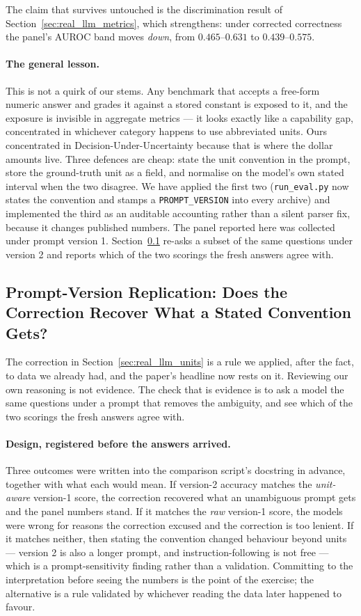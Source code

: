 \documentclass{article}
\begin{document}
The claim that survives untouched is the discrimination result of Section~\ref{sec:real_llm_metrics}, which strengthens: under corrected correctness the panel's AUROC band moves \emph{down}, from $0.465$--$0.631$ to $0.439$--$0.575$.

\paragraph{The general lesson.} This is not a quirk of our stems. Any benchmark that accepts a free-form numeric answer and grades it against a stored constant is exposed to it, and the exposure is invisible in aggregate metrics --- it looks exactly like a capability gap, concentrated in whichever category happens to use abbreviated units. Ours concentrated in Decision-Under-Uncertainty because that is where the dollar amounts live. Three defences are cheap: state the unit convention in the prompt, store the ground-truth unit as a field, and normalise on the model's own stated interval when the two disagree. We have applied the first two (\texttt{run\_eval.py} now states the convention and stamps a \texttt{PROMPT\_VERSION} into every archive) and implemented the third as an auditable accounting rather than a silent parser fix, because it changes published numbers. The panel reported here was collected under prompt version 1. Section~\ref{sec:real_llm_promptv2} re-asks a subset of the same questions under version 2 and reports which of the two scorings the fresh answers agree with.

\subsection{Prompt-Version Replication: Does the Correction Recover What a Stated Convention Gets?}
\label{sec:real_llm_promptv2}

The correction in Section~\ref{sec:real_llm_units} is a rule we applied, after the fact, to data we already had, and the paper's headline now rests on it. Reviewing our own reasoning is not evidence. The check that is evidence is to ask a model the same questions under a prompt that removes the ambiguity, and see which of the two scorings the fresh answers agree with.

\paragraph{Design, registered before the answers arrived.} Three outcomes were written into the comparison script's docstring in advance, together with what each would mean. If version-2 accuracy matches the \emph{unit-aware} version-1 score, the correction recovered what an unambiguous prompt gets and the panel numbers stand. If it matches the \emph{raw} version-1 score, the models were wrong for reasons the correction excused and the correction is too lenient. If it matches neither, then stating the convention changed behaviour beyond units --- version 2 is also a longer prompt, and instruction-following is not free --- which is a prompt-sensitivity finding rather than a validation. Committing to the interpretation before seeing the numbers is the point of the exercise; the alternative is a rule validated by whichever reading the data later happened to favour.
\end{document}
